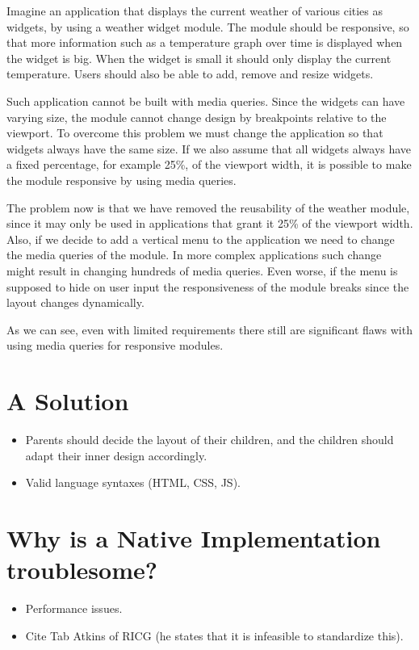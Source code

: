 \documentclass{sigchi}
\begin{document}
  Imagine an application that displays the current weather of various cities as widgets, by using a weather widget module.
  The module should be responsive, so that more information such as a temperature graph over time is displayed when the widget is big.
  When the widget is small it should only display the current temperature.
  Users should also be able to add, remove and resize widgets.

  Such application cannot be built with media queries.
  Since the widgets can have varying size, the module cannot change design by breakpoints relative to the viewport.
  To overcome this problem we must change the application so that widgets always have the same size.
  If we also assume that all widgets always have a fixed percentage, for example 25\%, of the viewport width, it is possible to make the module responsive by using media queries.

  The problem now is that we have removed the reusability of the weather module, since it may only be used in applications that grant it 25\% of the viewport width.
  Also, if we decide to add a vertical menu to the application we need to change the media queries of the module.
  In more complex applications such change might result in changing hundreds of media queries.
  Even worse, if the menu is supposed to hide on user input the responsiveness of the module breaks since the layout changes dynamically.

  As we can see, even with limited requirements there still are significant flaws with using media queries for responsive modules.

\section{A Solution}
  \begin{itemize}
    \item Parents should decide the layout of their children, and the children should adapt their inner design accordingly.
    \item Valid language syntaxes (HTML, CSS, JS).
  \end{itemize}

\section{Why is a Native Implementation troublesome?}
  \begin{itemize}
    \item Performance issues.
    \item Cite Tab Atkins of RICG (he states that it is infeasible to standardize this).
  \end{itemize}
\end{document}
